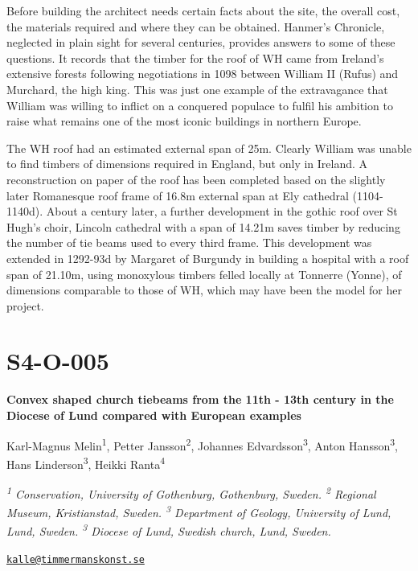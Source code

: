 \documentclass[
]{book}
\begin{document}
Before building the architect needs certain facts about the site, the overall cost, the materials required and where they can be obtained. Hanmer's Chronicle, neglected in plain sight for several centuries, provides answers to some of these questions. It records that the timber for the roof of WH came from Ireland's extensive forests following negotiations in 1098 between William II (Rufus) and Murchard, the high king. This was just one example of the extravagance that William was willing to inflict on a conquered populace to fulfil his ambition to raise what remains one of the most iconic buildings in northern Europe.

The WH roof had an estimated external span of 25m. Clearly William was unable to find timbers of dimensions required in England, but only in Ireland. A reconstruction on paper of the roof has been completed based on the slightly later Romanesque roof frame of 16.8m external span at Ely cathedral (1104-1140d). About a century later, a further development in the gothic roof over St Hugh's choir, Lincoln cathedral with a span of 14.21m saves timber by reducing the number of tie beams used to every third frame. This development was extended in 1292-93d by Margaret of Burgundy in building a hospital with a roof span of 21.10m, using monoxylous timbers felled locally at Tonnerre (Yonne), of dimensions comparable to those of WH, which may have been the model for her project.

\hypertarget{s4-o-005}{%
\section*{S4-O-005}\label{s4-o-005}}

\textbf{Convex shaped church tiebeams from the 11th - 13th century in the Diocese of Lund compared with European examples}

Karl-Magnus Melin\textsuperscript{1}, Petter Jansson\textsuperscript{2}, Johannes Edvardsson\textsuperscript{3}, Anton Hansson\textsuperscript{3}, Hans Linderson\textsuperscript{3}, Heikki Ranta\textsuperscript{4}

\emph{\textsuperscript{1} Conservation, University of Gothenburg, Gothenburg, Sweden. \textsuperscript{2} Regional Museum, Kristianstad, Sweden. \textsuperscript{3} Department of Geology, University of Lund, Lund, Sweden. \textsuperscript{3} Diocese of Lund, Swedish church, Lund, Sweden.}

\href{mailto:kalle@timmermanskonst.se}{\nolinkurl{kalle@timmermanskonst.se}}
\end{document}
